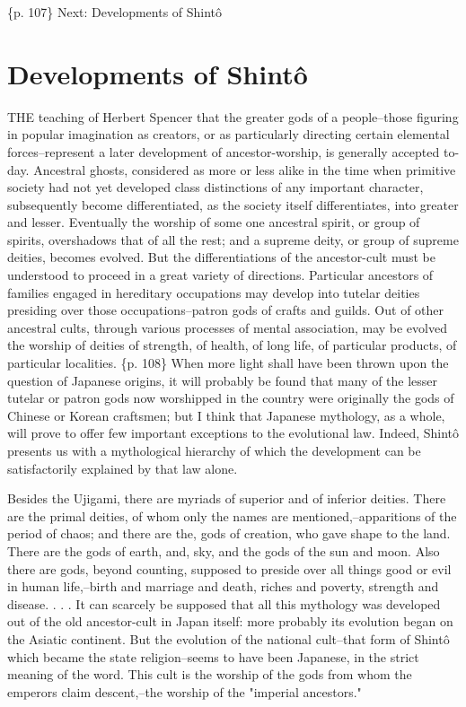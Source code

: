 \{p. 107\}
Next: Developments of Shintô

\section{Developments of Shintô}
\label{sec:org04a6cbd}

THE teaching of Herbert Spencer that the greater gods of a people--those figuring in popular imagination as creators, or as particularly directing certain elemental forces--represent a later development of ancestor-worship, is generally accepted to-day. Ancestral ghosts, considered as more or less alike in the time when primitive society had not yet developed class distinctions of any important character, subsequently become differentiated, as the society itself differentiates, into greater and lesser. Eventually the worship of some one ancestral spirit, or group of spirits, overshadows that of all the rest; and a supreme deity, or group of supreme deities, becomes evolved. But the differentiations of the ancestor-cult must be understood to proceed in a great variety of directions. Particular ancestors of families engaged in hereditary occupations may develop into tutelar deities presiding over those occupations--patron gods of crafts and guilds. Out of other ancestral cults, through various processes of mental association, may be evolved the worship of deities of strength, of health, of long life, of particular products, of particular localities. \{p. 108\} When more light shall have been thrown upon the question of Japanese origins, it will probably be found that many of the lesser tutelar or patron gods now worshipped in the country were originally the gods of Chinese or Korean craftsmen; but I think that Japanese mythology, as a whole, will prove to offer few important exceptions to the evolutional law. Indeed, Shintô presents us with a mythological hierarchy of which the development can be satisfactorily explained by that law alone.

Besides the Ujigami, there are myriads of superior and of inferior deities. There are the primal deities, of whom only the names are mentioned,--apparitions of the period of chaos; and there are the, gods of creation, who gave shape to the land. There are the gods of earth, and, sky, and the gods of the sun and moon. Also there are gods, beyond counting, supposed to preside over all things good or evil in human life,--birth and marriage and death, riches and poverty, strength and disease. . . . It can scarcely be supposed that all this mythology was developed out of the old ancestor-cult in Japan itself: more probably its evolution began on the Asiatic continent. But the evolution of the national cult--that form of Shintô which became the state religion--seems to have been Japanese, in the strict meaning of the word. This cult is the worship of the gods from whom the emperors claim descent,--the worship of the "imperial ancestors."


